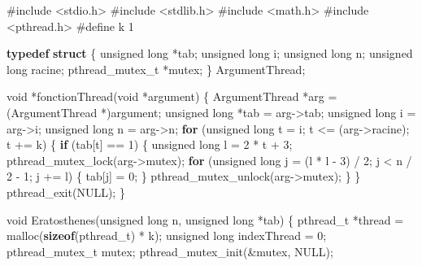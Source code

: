 \documentclass[
    ]{article}
\newenvironment{Shaded}{}{}
\newcommand{\ControlFlowTok}[1]{\textcolor[rgb]{0.00,0.44,0.13}{\textbf{#1}}}
\newcommand{\DataTypeTok}[1]{\textcolor[rgb]{0.56,0.13,0.00}{#1}}
\newcommand{\DecValTok}[1]{\textcolor[rgb]{0.25,0.63,0.44}{#1}}
\newcommand{\ImportTok}[1]{#1}
\newcommand{\KeywordTok}[1]{\textcolor[rgb]{0.00,0.44,0.13}{\textbf{#1}}}
\newcommand{\NormalTok}[1]{#1}
\newcommand{\PreprocessorTok}[1]{\textcolor[rgb]{0.74,0.48,0.00}{#1}}
\begin{document}
\begin{Shaded}
\begin{Highlighting}[]
\PreprocessorTok{\#include }\ImportTok{\textless{}stdio.h\textgreater{}}
\PreprocessorTok{\#include }\ImportTok{\textless{}stdlib.h\textgreater{}}
\PreprocessorTok{\#include }\ImportTok{\textless{}math.h\textgreater{}}
\PreprocessorTok{\#include }\ImportTok{\textless{}pthread.h\textgreater{}}
\PreprocessorTok{\#define k 1}

\KeywordTok{typedef} \KeywordTok{struct}
\NormalTok{\{}
    \DataTypeTok{unsigned} \DataTypeTok{long}\NormalTok{ *tab;}
    \DataTypeTok{unsigned} \DataTypeTok{long}\NormalTok{ i;}
    \DataTypeTok{unsigned} \DataTypeTok{long}\NormalTok{ n;}
    \DataTypeTok{unsigned} \DataTypeTok{long}\NormalTok{ racine;}
\NormalTok{    pthread\_mutex\_t *mutex;}
\NormalTok{\} ArgumentThread;}


\DataTypeTok{void}\NormalTok{ *fonctionThread(}\DataTypeTok{void}\NormalTok{ *argument)}
\NormalTok{\{}
\NormalTok{    ArgumentThread *arg = (ArgumentThread *)argument;}
    \DataTypeTok{unsigned} \DataTypeTok{long}\NormalTok{ *tab = arg{-}\textgreater{}tab;}
    \DataTypeTok{unsigned} \DataTypeTok{long}\NormalTok{ i = arg{-}\textgreater{}i;}
    \DataTypeTok{unsigned} \DataTypeTok{long}\NormalTok{ n = arg{-}\textgreater{}n;}
    \ControlFlowTok{for}\NormalTok{ (}\DataTypeTok{unsigned} \DataTypeTok{long}\NormalTok{ t = i; t \textless{}= (arg{-}\textgreater{}racine); t += k)}
\NormalTok{    \{}
        \ControlFlowTok{if}\NormalTok{ (tab[t] == }\DecValTok{1}\NormalTok{)}
\NormalTok{        \{}
            \DataTypeTok{unsigned} \DataTypeTok{long}\NormalTok{ l = }\DecValTok{2}\NormalTok{ * t + }\DecValTok{3}\NormalTok{;}
\NormalTok{            pthread\_mutex\_lock(arg{-}\textgreater{}mutex);}
            \ControlFlowTok{for}\NormalTok{ (}\DataTypeTok{unsigned} \DataTypeTok{long}\NormalTok{ j = (l * l {-} }\DecValTok{3}\NormalTok{) / }\DecValTok{2}\NormalTok{; j \textless{} n / }\DecValTok{2}\NormalTok{ {-} }\DecValTok{1}\NormalTok{; j += l)}
\NormalTok{            \{}
\NormalTok{                tab[j] = }\DecValTok{0}\NormalTok{;}
\NormalTok{            \}}
\NormalTok{            pthread\_mutex\_unlock(arg{-}\textgreater{}mutex);}
\NormalTok{        \}}
\NormalTok{    \}}
\NormalTok{    pthread\_exit(NULL);}
\NormalTok{\}}

\DataTypeTok{void}\NormalTok{ Eratosthenes(}\DataTypeTok{unsigned} \DataTypeTok{long}\NormalTok{ n, }\DataTypeTok{unsigned} \DataTypeTok{long}\NormalTok{ *tab)}
\NormalTok{\{}
\NormalTok{    pthread\_t *thread = malloc(}\KeywordTok{sizeof}\NormalTok{(pthread\_t) * k);}
    \DataTypeTok{unsigned} \DataTypeTok{long}\NormalTok{ indexThread = }\DecValTok{0}\NormalTok{;}
\NormalTok{    pthread\_mutex\_t mutex;}
\NormalTok{    pthread\_mutex\_init(\&mutex, NULL);}


\end{Highlighting}
\end{Shaded}
\end{document}

